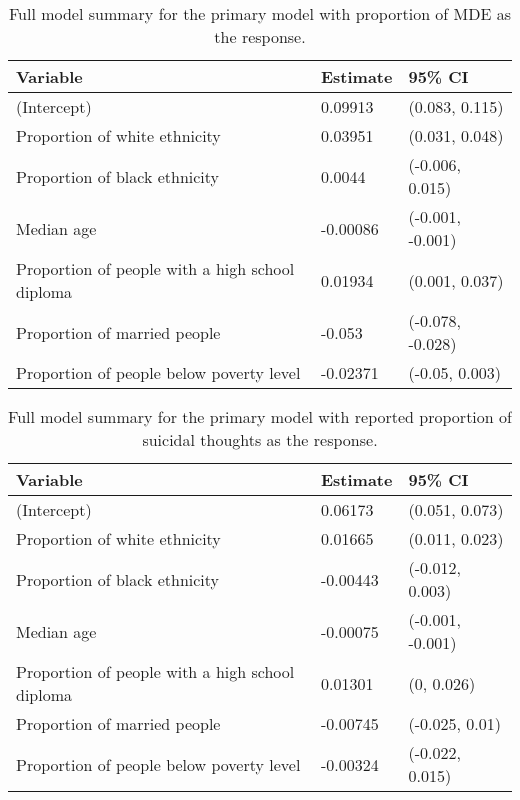 \documentclass{article}
\begin{document}
\begin{table}[t]
\begin{center}
\begin{tabular}{lll}
    \toprule
    Variable & Estimate & 95\% CI\\
    \midrule
    (Intercept) & 0.09913 & (0.083, 0.115)\\
    Proportion of white ethnicity & 0.03951 & (0.031, 0.048)\\
    Proportion of black ethnicity & 0.0044 & (-0.006, 0.015)\\
    Median age & -0.00086 & (-0.001, -0.001)\\
    Proportion of people with a high school diploma & 0.01934 & (0.001, 0.037)\\
    Proportion of married people & -0.053 & (-0.078, -0.028)\\
    Proportion of people below poverty level & -0.02371 & (-0.05, 0.003)\\
    \bottomrule
\end{tabular}
\end{center}
\caption{\label{tab:primary-mde-full-summary}
    Full model summary for the primary model with
    proportion of MDE
    as the response.
}
\end{table}

\begin{table}[h]
\begin{center}
    \begin{tabular}{lll}
    \toprule
    Variable & Estimate & 95\% CI\\
    \midrule
    (Intercept) & 0.06173 & (0.051, 0.073)\\
    Proportion of white ethnicity & 0.01665 & (0.011, 0.023)\\
    Proportion of black ethnicity & -0.00443 & (-0.012, 0.003)\\
    Median age & -0.00075 & (-0.001, -0.001)\\
    Proportion of people with a high school diploma & 0.01301 & (0, 0.026)\\
    Proportion of married people & -0.00745 & (-0.025, 0.01)\\
    Proportion of people below poverty level & -0.00324 & (-0.022, 0.015)\\
    \bottomrule
\end{tabular}
\end{center}
\caption{\label{tab:primary-suicidal-thoughts-full-summary}
    Full model summary for the primary model with
    reported proportion of suicidal thoughts
    as the response.
}
\end{table}
\end{document}
